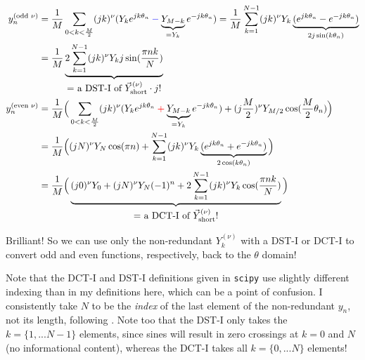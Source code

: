 \documentclass[10pt]{article}
\begin{document}
\begin{align}
y_n^{(\text{odd } \nu)} &= \frac{1}{M} \sum_{0 < k < \frac{M}{2}} (jk)^\nu (Y_k e^{jk\theta_n} \color{blue}-\color{black} \underbrace{Y_{M-k}}_{= Y_k} e^{-jk\theta_n}) = \frac{1}{M} \sum_{k=1}^{N-1} (jk)^\nu Y_k \underbrace{(e^{jk\theta_n} - e^{-jk\theta_n})}_{2j\sin(k\theta_n)} \notag \\
&= \frac{1}{M} \underbrace{2 \sum_{k=1}^{N-1} (jk)^\nu Y_k j \sin(\frac{\pi nk}{N})}_{\text{\normalsize = a DST-I of $\vec{Y}_{\text{short}}^{(\nu)} \cdot j$!}} \label{y_prime_odd}\\
y_n^{(\text{even } \nu)} &= \frac{1}{M} \Big( \sum_{0 < k < \frac{M}{2}} (jk)^\nu (Y_k e^{jk\theta_n} \color{red}+\color{black} \underbrace{Y_{M-k}}_{= Y_k} e^{-jk\theta_n}) + (j\frac{M}{2})^\nu Y_{M/2} \cos(\frac{M}{2}\theta_n) \Big) \notag \\
&= \frac{1}{M} \Big( (jN)^\nu Y_N \cos(\pi n) + \sum_{k=1}^{N-1} (jk)^\nu Y_k \underbrace{(e^{jk\theta_n} + e^{-jk\theta_n})}_{2\cos(k\theta_n)} \Big) \notag \\
&= \frac{1}{M} \Big( \underbrace{(j0)^\nu Y_0 + (jN)^\nu Y_N (-1)^n + 2 \sum_{k=1}^{N-1} (jk)^\nu Y_k \cos(\frac{\pi nk}{N})}_{\text{\normalsize = a DCT-I of $\vec{Y}_{\text{short}}^{(\nu)}$!}} \Big) \label{y_prime_even}
\end{align}

Brilliant! So we can use only the non-redundant $Y_k^{(\nu)}$ with a DST-I or DCT-I to convert odd and even functions, respectively, back to the $\theta$ domain!

Note that the DCT-I and DST-I definitions given in \texttt{scipy}\cite{dct}\cite{dst} use slightly different indexing than in my definitions here, which can be a point of confusion. I consistently take $N$ to be the \textit{index} of the last element of the non-redundant $y_n$, not its length, following \cite{trefethen8}. Note too that the DST-I only takes the $k = \{1, ... N-1\}$ elements, since sines will result in zero crossings at $k = 0$ and $N$ (no informational content), whereas the DCT-I takes all $k = \{0, ... N\}$ elements!
\end{document}
